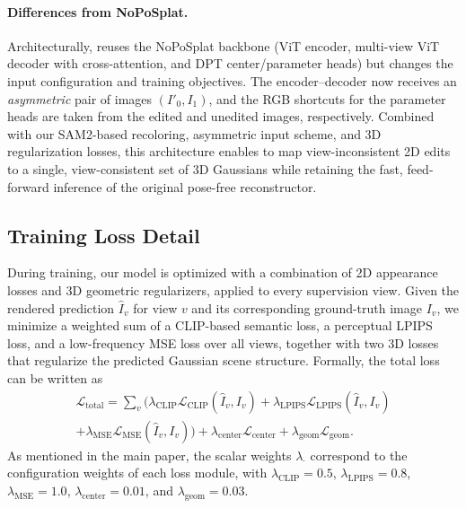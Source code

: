\paragraph{Differences from NoPoSplat.}
Architecturally, {\ourmethod} reuses the NoPoSplat backbone (ViT encoder, multi-view ViT decoder with cross-attention, and DPT center/parameter heads) but changes the input configuration and training objectives.
The encoder--decoder now receives an \emph{asymmetric} pair of images \((I'_0, I_1)\), and the RGB shortcuts for the parameter heads are taken from the edited and unedited images, respectively.
Combined with our SAM2-based recoloring, asymmetric input scheme, and 3D regularization losses, this architecture enables {\ourmethod} to map view-inconsistent 2D edits to a single, view-consistent set of 3D Gaussians while retaining the fast, feed-forward inference of the original pose-free reconstructor.

\subsection{Training Loss Detail}
During training, our model is optimized with a combination of 2D appearance losses and 3D geometric regularizers, applied to every supervision view. Given the rendered prediction $\hat{I}_v$ for view $v$ and its corresponding ground-truth image $I_v$, we minimize a weighted sum of a CLIP-based semantic loss, a perceptual LPIPS loss, and a low-frequency MSE loss over all views, together with two 3D losses that regularize the predicted Gaussian scene structure. Formally, the total loss can be written as
\begin{equation*}
\begin{split}
\mathcal{L}_{\text{total}}
= \sum_{v} \Big(
\lambda_{\text{CLIP}} \mathcal{L}_{\text{CLIP}}(\hat{I}_v, I_v)
+ \lambda_{\text{LPIPS}} \mathcal{L}_{\text{LPIPS}}(\hat{I}_v, I_v)\\
+ \lambda_{\text{MSE}} \mathcal{L}_{\text{MSE}}(\hat{I}_v, I_v)
\Big)
+ \lambda_{\text{center}} \mathcal{L}_{\text{center}}
+ \lambda_{\text{geom}} \mathcal{L}_{\text{geom}}.
\end{split}
\end{equation*}
As mentioned in the main paper, the scalar weights $\lambda_{\cdot}$ correspond to the configuration weights of each loss module, with $\lambda_{\text{CLIP}} = 0.5$, $\lambda_{\text{LPIPS}} = 0.8$, $\lambda_{\text{MSE}} = 1.0$, $\lambda_{\text{center}} = 0.01$, and $\lambda_{\text{geom}} = 0.03$.



